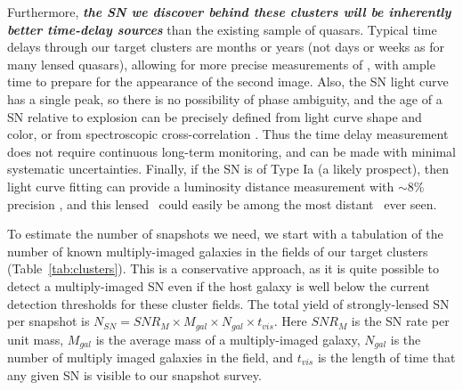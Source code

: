 Furthermore, {\bf \em the SN we discover behind these clusters will be
inherently better time-delay sources} than the existing sample of
quasars.  Typical time delays through our target clusters are months
or years (not days or weeks as for many lensed quasars), allowing for
more precise measurements of \dt, with ample time to prepare for the
appearance of the second image.  Also, the SN light curve has a single
peak, so there is no possibility of phase ambiguity, and the age of a
SN relative to explosion can be precisely defined from light curve
shape and color, or from spectroscopic
cross-correlation \citep{Filippenko:1997,Blondin:2007}.  Thus the time
delay measurement does not require continuous long-term monitoring,
and can be made with minimal systematic uncertainties.  Finally, if
the SN is of Type Ia (a likely prospect), then light curve fitting can
provide a luminosity distance measurement with $\sim$8\%
precision \citep{Phillips:1993}, and this lensed \SNIa\ could easily
be among the most distant \SNIa\ ever seen.





\medskip
{}

To estimate the number of snapshots we need, we start with a
tabulation of the number of known multiply-imaged galaxies in the
fields of our target clusters (Table~\ref{tab:clusters}).  This is a
conservative approach, as it is quite possible to detect a
multiply-imaged SN even if the host galaxy is well below the current
detection thresholds for these cluster fields. The total yield of
strongly-lensed SN per snapshot is 
$N_{SN} = SNR_{M} \times M_{gal} \times N_{gal} \times t_{vis}$. 
Here $SNR_M$ is the SN rate per unit mass, $M_{gal}$ is
the average mass of a multiply-imaged galaxy, $N_{gal}$ is the number
of multiply imaged galaxies in the field, and $t_{vis}$ is the length
of time that any given SN is visible to our snapshot survey.  

